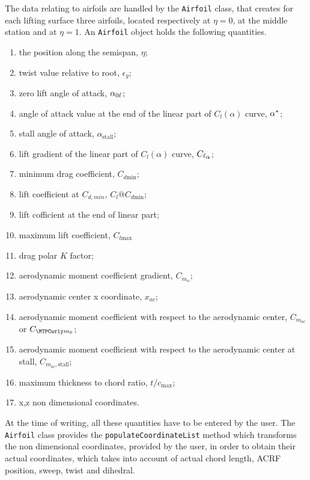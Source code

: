 \bigskip
\noindent
The data relating to airfoils are handled by the \lstinline[language=Java]!Airfoil! class, that creates for each lifting surface three airfoils, located respectively at $\eta=0$, at the middle station and at $\eta=1$. An \lstinline[language=Java]!Airfoil! object holds the following quantities.
%
\begin{enumerate}
	\item the position along the semispan, $\eta$;
	\item twist value relative to root, $\epsilon_g$;
	\item zero lift angle of attack, $\alpha_{{0\ell}}$;
	\item angle of attack value at the end of the linear part of $C_l(\alpha)$ curve, $\alpha^*$;
	\item stall angle of attack, $\alpha_{\text{stall}}$;
	\item lift gradient of the linear part of $C_l(\alpha)$ curve, $\Clalphap$;
	\item minimum drag coefficient, $C_{d\text{min}}$;
	\item lift coefficient at $C_{d,min}$, $C_l@C_{d\text{min}}$;
	\item lift cofficient at the end of linear part;
	\item maximum lift coefficient, $C_{l\text{max}}$
	\item drag polar $K$ factor;
	\item aerodynamic moment coefficient gradient, $C_{m_\alpha}$;
	\item aerodynamic center x coordinate, $x_{ac}$;
	\item aerodynamic moment coefficient with respect to the aerodynamic center, $C_{m_{ac}}$ or $\Cmzerop$;
	\item aerodynamic moment coefficient with respect to the aerodynamic center at stall, $C_{m_{ac},\text{stall}}$;
	\item maximum thickness to chord ratio, $t/c_{\text{max}}$;
	\item x,z non dimensional coordinates.
\end{enumerate}
%
At the time of writing, all these quantities have to be entered by the user. The \lstinline[language=Java]!Airfoil! class provides the \lstinline[language=Java]!populateCoordinateList! method which transforms the non dimensional coordinates, provided by the user, in order to obtain their actual coordinates, which takes into account of actual chord length, \gls{ACRF} position, sweep, twist and dihedral.


